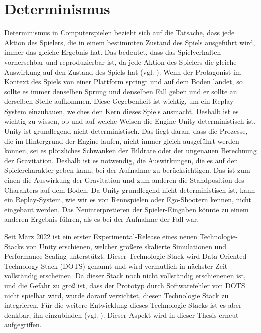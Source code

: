 \section{Determinismus}
Determinismus in Computerspielen bezieht sich auf die Tatsache, dass jede Aktion des Spielers, die in einem bestimmten Zustand des Spiels ausgeführt wird, immer das gleiche Ergebnis hat. Das bedeutet, dass das Spielverhalten vorhersehbar und reproduzierbar ist, da jede Aktion des Spielers die gleiche Auswirkung auf den Zustand des Spiels hat (vgl. \cite{noauthor_game_nodate}). Wenn der Protagonist im Kontext des Spiels von einer Plattform springt und auf dem Boden landet, so sollte es immer denselben Sprung und denselben Fall geben und er sollte an derselben Stelle aufkommen.
Diese Gegebenheit ist wichtig, um ein Replay-System einzubauen, welches den Kern dieses Spiels ausmacht. Deshalb ist es wichtig zu wissen, ob und auf welche Weisen die Engine Unity deterministisch ist. 
Unity ist grundlegend nicht deterministisch. Das liegt daran, dass die Prozesse, die im Hintergrund der Engine laufen, nicht immer gleich ausgeführt werden können, sei es plötzliches Schwanken der Bildrate oder der ungenauen Berechnung der Gravitation. Deshalb ist es notwendig, die Auswirkungen, die es auf den Spielercharakter geben kann, bei der Aufnahme zu berücksichtigen. Das ist zum einen die Auswirkung der Gravitation und zum anderen die Standposition des Charakters auf dem Boden. 
Da Unity grundlegend nicht deterministisch ist, kann ein Replay-System, wie wir es von Rennspielen oder Ego-Shootern kennen, nicht eingebaut werden. Das Neuinterpretieren der Spieler-Eingaben könnte zu einem anderen Ergebnis führen, als es bei der Aufnahme der Fall war.

Seit März 2022 ist ein erster Experimental-Release eines neuen Technologie-Stacks von Unity erschienen, welcher größere skalierte Simulationen und Performance Scaling unterstützt. Dieser Technologie Stack wird Data-Oriented Technology Stack (DOTS) genannt und wird vermutlich in nächster Zeit vollständig erscheinen. Da dieser Stack noch nicht vollständig erschienenen ist, und die Gefahr zu groß ist, dass der Prototyp durch Softwarefehler von DOTS nicht spielbar wird, wurde darauf verzichtet, diesen Technologie Stack zu integrieren. Für die weitere Entwicklung dieses Technologie Stacks ist es aber denkbar, ihn einzubinden  (vgl. \cite{technologies_dots_nodate}). Dieser Aspekt wird in  dieser Thesis erneut aufgegriffen.
